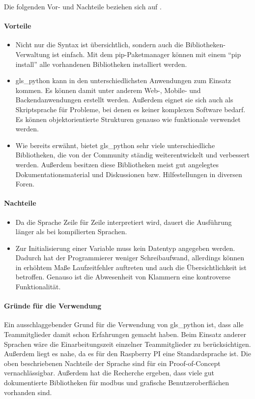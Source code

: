 Die folgenden Vor- und Nachteile beziehen sich auf \textcite{Ceaseo:2020}.
\paragraph{Vorteile}
\begin{itemize}
	\item Nicht nur die Syntax ist übersichtlich, sondern auch die Bibliotheken-Verwaltung ist einfach. Mit dem pip-Paketmanager können mit einem \enquote{pip install} alle vorhandenen Bibliotheken installiert werden.
	\item \gls{gls_python} kann in den unterschiedlichsten Anwendungen zum Einsatz kommen. Es können damit unter anderem Web-, Mobile- und Backendanwendungen erstellt werden. Außerdem eignet sie sich auch als Skriptsprache für Probleme, bei denen es keiner komplexen Software bedarf. Es können objektorientierte Strukturen genauso wie funktionale verwendet werden. 
	\item Wie bereits erwähnt, bietet \gls{gls_python} sehr viele unterschiedliche Bibliotheken, die von der Community ständig weiterentwickelt und verbessert werden. Außerdem besitzen diese Bibliotheken meist gut angelegtes Dokumentationsmaterial und Diskussionen bzw. Hilfestellungen in diversen Foren.
\end{itemize}

\paragraph{Nachteile}
\begin{itemize}{}{}
	\item Da die Sprache Zeile für Zeile interpretiert wird, dauert die Ausführung länger als bei kompilierten Sprachen.
	\item Zur Initialisierung einer Variable muss kein Datentyp angegeben werden. Dadurch hat der Programmierer weniger Schreibaufwand, allerdings können in erhöhtem Maße Laufzeitfehler auftreten und auch die Übersichtlichkeit ist betroffen. Genauso ist die Abwesenheit von Klammern eine kontroverse Funktionalität.
\end{itemize}

\paragraph{Gründe für die Verwendung}
Ein ausschlaggebender Grund für die Verwendung von \gls{gls_python} ist, dass alle Teammitglieder damit schon Erfahrungen gemacht haben. Beim Einsatz anderer Sprachen wäre die Einarbeitungszeit einzelner Teammitglieder zu berücksichtigen. Außerdem liegt es nahe, da es für den Raspberry PI eine Standardsprache ist. Die oben beschriebenen Nachteile der Sprache sind für ein Proof-of-Concept vernachlässigbar. Außerdem hat die Recherche ergeben, dass viele gut dokumentierte Bibliotheken für \gls{modbus} und grafische Benutzeroberflächen vorhanden sind.

